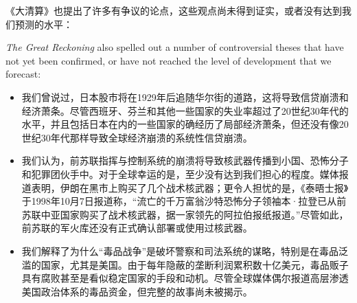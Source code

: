 \begin{paracol}{2}
\switchcolumn*
《大清算》也提出了许多有争议的论点，这些观点尚未得到证实，或者没有达到我们预测的水平：

\switchcolumn
\emph{The Great Reckoning} also spelled out a number of controversial theses that have not yet been confirmed, or have not reached the level of development that we forecast:

\switchcolumn*
\begin{itemize}
    \item 我们曾说过，日本股市将在1929年后追随华尔街的道路，这将导致信贷崩溃和经济萧条。尽管西班牙、芬兰和其他一些国家的失业率超过了20世纪30年代的水平，并且包括日本在内的一些国家的确经历了局部经济萧条，但还没有像20世纪30年代那样导致全球经济崩溃的系统性信贷崩溃。
    \item 我们认为，前苏联指挥与控制系统的崩溃将导致核武器传播到小国、恐怖分子和犯罪团伙手中。对于全球幸运的是，至少没有达到我们担心的程度。媒体报道表明，伊朗在黑市上购买了几个战术核武器；更令人担忧的是，《泰晤士报》于1998年10月7日报道称，“流亡的千万富翁沙特恐怖分子领袖本·拉登已从前苏联中亚国家购买了战术核武器，据一家领先的阿拉伯报纸报道。”尽管如此，前苏联的军火库还没有正式确认部署或使用过核武器。
    \item 我们解释了为什么“毒品战争”是破坏警察和司法系统的谋略，特别是在毒品泛滥的国家，尤其是美国。由于每年隐蔽的垄断利润累积数十亿美元，毒品贩子具有腐败甚至是看似稳定国家的手段和动机。尽管全球媒体偶尔报道高层渗透美国政治体系的毒品资金，但完整的故事尚未被揭示。
\end{itemize}


\end{paracol}
